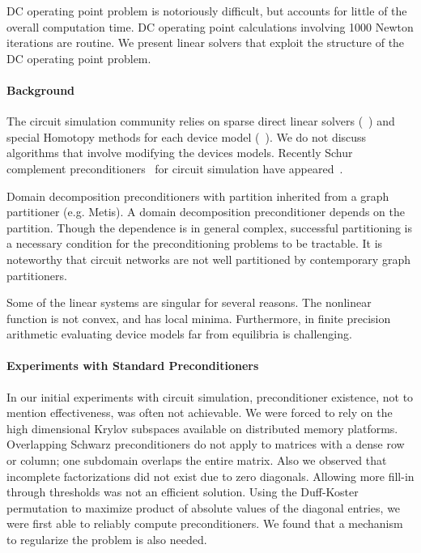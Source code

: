\documentclass[10pt,fleqn]{article}
\begin{document}
DC operating point problem is notoriously difficult, but accounts for
little of the overall computation time.  DC operating point calculations 
involving 1000 Newton iterations are routine.  We present linear solvers
that exploit the structure of the DC operating point problem.

\paragraph{Background}
The circuit simulation community relies on sparse direct linear solvers
(~\cite{Ksparse86}) and special Homotopy methods for each device model
(~\cite{MTFW93}).  We do not discuss algorithms that involve modifying the
devices models.  Recently Schur complement preconditioners~\cite{SaadSosonkina00}
 for circuit simulation have appeared~\cite{BCGJH03}.

Domain decomposition preconditioners with partition inherited from a
graph partitioner (e.g. Metis).  A domain decomposition preconditioner
depends on the partition.  Though the dependence is in general complex, 
successful partitioning is a necessary condition for the preconditioning
problems to be tractable.  It is noteworthy that circuit networks 
are not well partitioned by contemporary graph partitioners.

Some of the linear systems are singular for several reasons.  The
nonlinear function is not convex, and has local minima.  Furthermore,
in finite precision arithmetic evaluating device models far from
equilibria is challenging.

\paragraph{Experiments with Standard Preconditioners}
In our initial experiments with circuit simulation, preconditioner
existence, not to mention effectiveness, was often not achievable.
We were forced to rely on the high dimensional Krylov subspaces available
on distributed memory platforms.  Overlapping Schwarz preconditioners
do not apply to matrices with a dense row or column; one subdomain
overlaps the entire matrix.  Also we observed that incomplete
factorizations did not exist due to zero diagonals.  Allowing more
fill-in through thresholds was not an efficient solution.  Using the
Duff-Koster permutation to maximize product of absolute values of the
diagonal entries, we were first able to reliably compute preconditioners. 
We found that a mechanism to regularize the problem is also needed.
\end{document}
